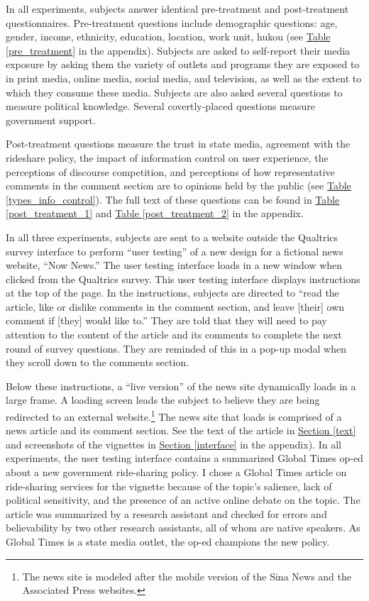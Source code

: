 \documentclass[11pt]{article}
\begin{document}
In all experiments, subjects answer identical pre-treatment and post-treatment questionnaires. Pre-treatment questions include demographic questions: age, gender, income, ethnicity, education, location, work unit, hukou (see \hyperref[pre_treatment]{Table \ref*{pre_treatment}} in the appendix). Subjects are asked to self-report their media exposure by asking them the variety of outlets and programs they are exposed to in print media, online media, social media, and television, as well as the extent to which they consume these media. Subjects are also asked several questions to measure political knowledge. Several covertly-placed questions measure government support.

Post-treatment questions measure the trust in state media, agreement with the rideshare policy, the impact of information control on user experience, the perceptions of discourse competition, and perceptions of how representative comments in the comment section are to opinions held by the public (see \hyperref[types_info_control]{Table \ref*{types_info_control}}). The full text of these questions can be found in \hyperref[post_treatment_1]{Table \ref*{post_treatment_1}} and \hyperref[post_treatment_2]{Table \ref*{post_treatment_2}} in the appendix.

In all three experiments, subjects are sent to a website outside the Qualtrics survey interface to perform ``user testing'' of a new design for a fictional news website, ``Now News.'' The user testing interface loads in a new window when clicked from the Qualtrics survey. This user testing interface displays instructions at the top of the page. In the instructions, subjects are directed to ``read the article, like or dislike comments in the comment section, and leave [their] own comment if [they] would like to.'' They are told that they will need to pay attention to the content of the article and its comments to complete the next round of survey questions. They are reminded of this in a pop-up modal when they scroll down to the comments section.

Below these instructions, a ``live version'' of the news site dynamically loads in a large frame. A loading screen leads the subject to believe they are being redirected to an external website.\footnote{The news site is modeled after the mobile version of the Sina News and the Associated Press websites.} The news site that loads is comprised of a news article and its comment section. See the text of the article in \hyperref[text]{Section \ref*{text}} and screenshots of the vignettes in \hyperref[interface]{Section \ref*{interface}} in the appendix). In all experiments, the user testing interface contains a summarized Global Times op-ed about a new government ride-sharing policy. I chose a Global Times article on ride-sharing services for the vignette because of the topic's salience, lack of political sensitivity, and the presence of an active online debate on the topic. The article was summarized by a research assistant and checked for errors and believability by two other research assistants, all of whom are native speakers. As Global Times is a state media outlet, the op-ed champions the new policy.
\end{document}
